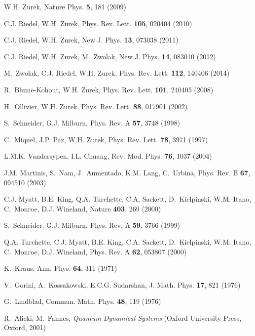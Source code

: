 \documentclass[aps,pra,reprint,amsmath,amssymb,showpacs,nofootinbib,floatfix,onecolumn,12pt]{revtex4-1}
\begin{document}
\begin{thebibliography}{100}
W.H. Zurek, Nature Phys. \textbf{5}, 181 (2009)

C.J. Riedel, W.H. Zurek, Phys. Rev. Lett. \textbf{105}, 020404 (2010)

C.J. Riedel, W.H. Zurek, New J. Phys. \textbf{13}, 073038 (2011)

C.J. Riedel, W.H. Zurek, M.~Zwolak, New J. Phys. \textbf{14}, 083010 (2012)

M.~Zwolak, C.J. Riedel, W.H. Zurek, Phys. Rev. Lett. \textbf{112}, 140406
  (2014)

R.~Blume-Kohout, W.H. Zurek, Phys. Rev. Lett. \textbf{101}, 240405 (2008)

H.~Ollivier, W.H. Zurek, Phys. Rev. Lett. \textbf{88}, 017901 (2002)

S.~Schneider, G.J. Milburn, Phys. Rev. A \textbf{57}, 3748 (1998)

C.~Miquel, J.P. Paz, W.H. Zurek, Phys. Rev. Lett. \textbf{78}, 3971 (1997)

L.M.K. Vandersypen, I.L. Chuang, Rev. Mod. Phys. \textbf{76}, 1037 (2004)

J.M. Martinis, S.~Nam, J.~Aumentado, K.M. Lang, C.~Urbina, Phys. Rev. B
  \textbf{67}, 094510 (2003)

C.J. Myatt, B.E. King, Q.A. Turchette, C.A. Sackett, D.~Kielpinski, W.M. Itano,
  C.~Monroe, D.J. Wineland, Nature \textbf{403}, 269 (2000)

S.~Schneider, G.J. Milburn, Phys. Rev. A \textbf{59}, 3766 (1999)

Q.A. Turchette, C.J. Myatt, B.E. King, C.A. Sackett, D.~Kielpinski, W.M. Itano,
  C.~Monroe, D.J. Wineland, Phys. Rev. A \textbf{62}, 053807 (2000)

K.~Kraus, Ann. Phys. \textbf{64}, 311 (1971)

V.~Gorini, A.~Kossakowski, E.C.G. Sudarshan, J. Math. Phys. \textbf{17}, 821
  (1976)

G.~Lindblad, Commun. Math. Phys. \textbf{48}, 119 (1976)

R.~Alicki, M.~Fannes, \emph{Quantum Dynamical Systems} (Oxford University
  Press, Oxford, 2001)


\end{thebibliography}
\end{document}
